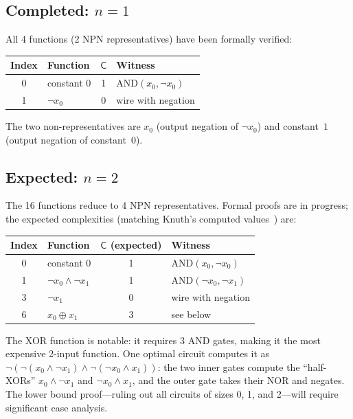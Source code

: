 \documentclass[11pt]{article}
\newcommand{\CC}{\mathsf{C}}
\begin{document}
\subsection{Completed: $n = 1$}

All 4 functions (2 NPN representatives) have been formally verified:

\begin{center}
\begin{tabular}{@{}clcl@{}}
\toprule
Index & Function & $\CC$ & Witness \\
\midrule
0 & constant $0$ & 1 & $\text{AND}(x_0, \lnot x_0)$ \\
1 & $\lnot x_0$ & 0 & wire with negation \\
\bottomrule
\end{tabular}
\end{center}

The two non-representatives are $x_0$ (output negation of $\lnot x_0$) and
constant~$1$ (output negation of constant~$0$).

\subsection{Expected: $n = 2$}

The 16 functions reduce to 4 NPN representatives. Formal proofs are in
progress; the expected complexities (matching Knuth's computed
values~\cite{knuth-4a}) are:

\begin{center}
\begin{tabular}{@{}clcl@{}}
\toprule
Index & Function & $\CC$ (expected) & Witness \\
\midrule
0 & constant $0$ & 1 & $\text{AND}(x_0, \lnot x_0)$ \\
1 & $\lnot x_0 \land \lnot x_1$ & 1 & $\text{AND}(\lnot x_0, \lnot x_1)$ \\
3 & $\lnot x_1$ & 0 & wire with negation \\
6 & $x_0 \oplus x_1$ & 3 & see below \\
\bottomrule
\end{tabular}
\end{center}

The XOR function is notable: it requires 3 AND gates, making it the most
expensive 2-input function. One optimal circuit computes it as
$\lnot(\lnot(x_0 \land \lnot x_1) \land \lnot(\lnot x_0 \land x_1))$:
the two inner gates compute the ``half-XORs'' $x_0 \land \lnot x_1$ and
$\lnot x_0 \land x_1$, and the outer gate takes their NOR and negates.
The lower bound proof---ruling out all circuits of sizes 0, 1, and 2---will
require significant case analysis.
\end{document}
